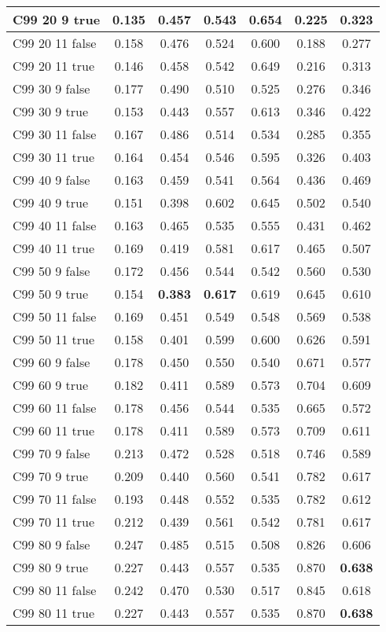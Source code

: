 \documentclass{article}
\begin{document}
\begin{tabular}{|l|c|c|c|c|c|c|}
C99 20  9 true & \textbf{0.135} & 0.457 & 0.543 & \textbf{0.654} & 0.225 & 0.323\\ \hline
C99 20 11 false & 0.158 & 0.476 & 0.524 & 0.600 & 0.188 & 0.277\\ \hline
C99 20 11 true & 0.146 & 0.458 & 0.542 & 0.649 & 0.216 & 0.313\\ \hline
C99 30  9 false & 0.177 & 0.490 & 0.510 & 0.525 & 0.276 & 0.346\\ \hline
C99 30  9 true & 0.153 & 0.443 & 0.557 & 0.613 & 0.346 & 0.422\\ \hline
C99 30 11 false & 0.167 & 0.486 & 0.514 & 0.534 & 0.285 & 0.355\\ \hline
C99 30 11 true & 0.164 & 0.454 & 0.546 & 0.595 & 0.326 & 0.403\\ \hline
C99 40  9 false & 0.163 & 0.459 & 0.541 & 0.564 & 0.436 & 0.469\\ \hline
C99 40  9 true & 0.151 & 0.398 & 0.602 & 0.645 & 0.502 & 0.540\\ \hline
C99 40 11 false & 0.163 & 0.465 & 0.535 & 0.555 & 0.431 & 0.462\\ \hline
C99 40 11 true & 0.169 & 0.419 & 0.581 & 0.617 & 0.465 & 0.507\\ \hline
C99 50  9 false & 0.172 & 0.456 & 0.544 & 0.542 & 0.560 & 0.530\\ \hline
C99 50  9 true & 0.154 & \textbf{0.383} & \textbf{0.617} & 0.619 & 0.645 & 0.610\\ \hline
C99 50 11 false & 0.169 & 0.451 & 0.549 & 0.548 & 0.569 & 0.538\\ \hline
C99 50 11 true & 0.158 & 0.401 & 0.599 & 0.600 & 0.626 & 0.591\\ \hline
C99 60  9 false & 0.178 & 0.450 & 0.550 & 0.540 & 0.671 & 0.577\\ \hline
C99 60  9 true & 0.182 & 0.411 & 0.589 & 0.573 & 0.704 & 0.609\\ \hline
C99 60 11 false & 0.178 & 0.456 & 0.544 & 0.535 & 0.665 & 0.572\\ \hline
C99 60 11 true & 0.178 & 0.411 & 0.589 & 0.573 & 0.709 & 0.611\\ \hline
C99 70  9 false & 0.213 & 0.472 & 0.528 & 0.518 & 0.746 & 0.589\\ \hline
C99 70  9 true & 0.209 & 0.440 & 0.560 & 0.541 & 0.782 & 0.617\\ \hline
C99 70 11 false & 0.193 & 0.448 & 0.552 & 0.535 & 0.782 & 0.612\\ \hline
C99 70 11 true & 0.212 & 0.439 & 0.561 & 0.542 & 0.781 & 0.617\\ \hline
C99 80  9 false & 0.247 & 0.485 & 0.515 & 0.508 & 0.826 & 0.606\\ \hline
C99 80  9 true & 0.227 & 0.443 & 0.557 & 0.535 & 0.870 & \textbf{0.638}\\ \hline
C99 80 11 false & 0.242 & 0.470 & 0.530 & 0.517 & 0.845 & 0.618\\ \hline
C99 80 11 true & 0.227 & 0.443 & 0.557 & 0.535 & 0.870 & \textbf{0.638}\\ \hline
\end{tabular} 
\end{document}
